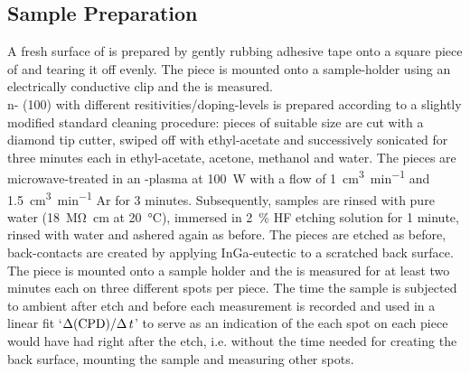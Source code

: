 \subsection{Sample Preparation}
A fresh surface of \hopg{} is prepared by gently rubbing adhesive tape onto a square piece of \hopg{} and tearing it off evenly. The piece is mounted onto a sample-holder using an electrically conductive clip and the \cpd{} is measured.\\
n-\sih{} (100) with different resitivities/doping-levels is prepared according to a slightly modified standard cleaning procedure: pieces of suitable size are cut with a diamond tip cutter, swiped off with ethyl-acetate and successively sonicated for three minutes each in ethyl-acetate, acetone, methanol and water. The pieces are microwave-treated in an \oxy{}-plasma at \SI{100}{\watt} with a flow of \SI{1}{\cubic\centi\metre\per\minute} \oxy{} and \SI{1.5}{\cubic\centi\metre\per\minute} Ar for 3 minutes. Subsequently, samples are rinsed with pure water (\SI{18}{\mega\ohm\centi\metre} at \SI{20}{\degreeCelsius}), immersed in \SI{2}{\percent} HF etching solution for 1 minute, rinsed with water and ashered again as before. The pieces are etched as before, back-contacts are created by applying InGa-eutectic to a scratched back surface. The piece is mounted onto a sample holder and the \cpd{} is measured for at least two minutes each on three different spots per piece. The time the sample is subjected to ambient after etch and before each measurement is recorded and used in a linear fit \lq{}$\Delta (\text{CPD}{})/\Delta \, t$\rq{} to serve as an indication of the \cpd{} each spot on each piece would have had right after the etch, i.e. without the time needed for creating the back surface, mounting the sample and measuring other spots.
